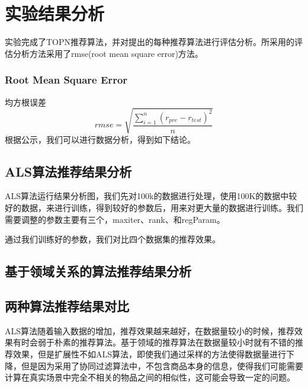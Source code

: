 \chapter{实验结果分析}
实验完成了TOPN推荐算法，并对提出的每种推荐算法进行评估分析。所采用的评估分析方法采用了rmse(root mean square error)方法。
\subsection{Root Mean Square Error}
均方根误差
$$rmse = \sqrt{\frac{\sum_{i=1}^{n}(r_{pre} - r_{test})^2}{n}}$$
根据公示，我们可以进行数据分析，得到如下结论。
\section{ALS算法推荐结果分析}
ALS算法运行结果分析图，我们先对100k的数据进行处理，使用100K的数据中较好的数据，来进行训练，得到较好的参数后，用来对更大量的数据进行训练。我们需要调整的参数主要有三个，maxiter、rank、和regParam。

通过我们训练好的参数，我们对比四个数据集的推荐效果。

\section{基于领域关系的算法推荐结果分析}
\section{两种算法推荐结果对比}
ALS算法随着输入数据的增加，推荐效果越来越好，在数据量较小的时候，推荐效果有时会弱于朴素的推荐算法。基于领域的推荐算法在数据量较小时就有不错的推荐效果，但是扩展性不如ALS算法，即使我们通过采样的方法使得数据量进行下降，但是因为采用了协同过滤算法中，不包含商品本身的信息，使得我们可能需要计算在真实场景中完全不相关的物品之间的相似性，这可能会导致一定的问题。

